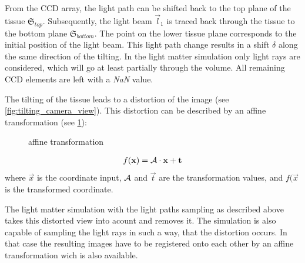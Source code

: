From the \ac{CCD} array, the light path can be shifted back to the top plane of the tissue $\mathfrak{S}_{top}$.
Subsequently, the light beam $\vec{l}_1$ is traced back through the tissue to the bottom plane $\mathfrak{S}_{bottom}$.
The point on the lower tissue plane corresponds to the initial position of the light beam.
This light path change results in a shift $\delta$ along the same direction of the tilting.
In the light matter simulation only light rays are considered, which will go at least partially through the volume.
All remaining \ac{CCD} elements are left with a \textit{NaN} value.
\par
%
The tilting of the tissue leads to a distortion of the image (see \cref{fig:tilting_camera_view}).
This distortion can be described by an affine transformation (see \cref{fig::affine_transformation}):
%
\begin{figure}[!t]
\centering

\caption{affine transformation}
\label{fig::affine_transformation}
\end{figure}
%
\begin{align}
f(\mathbf{x}) = \mathcal{A} \cdot \mathbf{x} + \mathbf{t}
\end{align}
where $\vec{x}$ is the coordinate input, $\mathcal{A}$ and $\vec{t}$ are the transformation values, and $f(\vec{x}$ is the transformed coordinate.
\par
%
The light matter simulation with the light paths sampling as described above takes this distorted view into acount and removes it.
The simulation is also capable of sampling the light rays in such a way, that the distortion occurs.
In that case the resulting images have to be registered onto each other \eg{} by an affine transformation wich is also available.
% 
% 
% 
